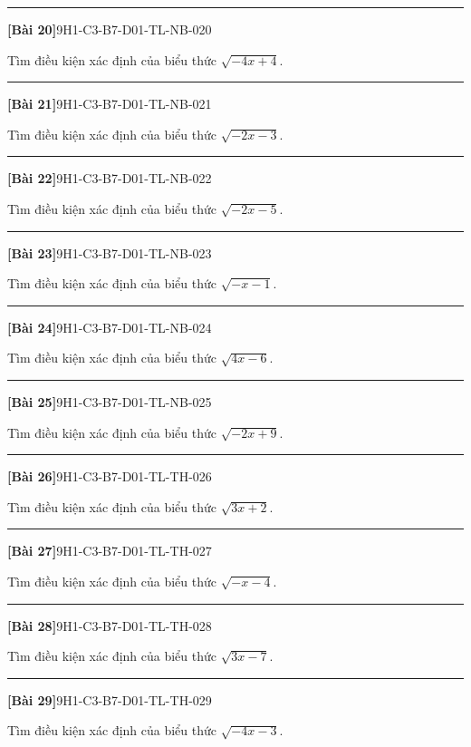 \documentclass[12pt,a4paper]{article}
\newif\ifloigiai
\newenvironment{cauhoi}[2]{%
  \par\medskip\noindent\rule{\textwidth}{0.4pt}\par\nopagebreak
  \noindent\textbf{[#1]}\hfill{\scriptsize\ttfamily #2}\par\nopagebreak\smallskip}{\par}
\newcommand{\loigiai}[1]{\ifloigiai\par\smallskip\noindent\textit{Lời giải.} #1\par\fi}
\begin{document}
\begin{cauhoi}{Bài 20}{9H1-C3-B7-D01-TL-NB-020}
Tìm điều kiện xác định của biểu thức $\sqrt{-4x + 4}$.
\loigiai{Biểu thức xác định khi $-4x + 4\ge 0$, tức là $4x\le 4$, suy ra $x\le 1$.}
\end{cauhoi}
\begin{cauhoi}{Bài 21}{9H1-C3-B7-D01-TL-NB-021}
Tìm điều kiện xác định của biểu thức $\sqrt{-2x - 3}$.
\loigiai{Biểu thức xác định khi $-2x - 3\ge 0$, tức là $2x\le -3$, suy ra $x\le -\dfrac{3}{2}$.}
\end{cauhoi}
\begin{cauhoi}{Bài 22}{9H1-C3-B7-D01-TL-NB-022}
Tìm điều kiện xác định của biểu thức $\sqrt{-2x - 5}$.
\loigiai{Biểu thức xác định khi $-2x - 5\ge 0$, tức là $2x\le -5$, suy ra $x\le -\dfrac{5}{2}$.}
\end{cauhoi}
\begin{cauhoi}{Bài 23}{9H1-C3-B7-D01-TL-NB-023}
Tìm điều kiện xác định của biểu thức $\sqrt{-x - 1}$.
\loigiai{Biểu thức xác định khi $-x - 1\ge 0$, tức là $x\le -1$, suy ra $x\le -1$.}
\end{cauhoi}
\begin{cauhoi}{Bài 24}{9H1-C3-B7-D01-TL-NB-024}
Tìm điều kiện xác định của biểu thức $\sqrt{4x - 6}$.
\loigiai{Biểu thức xác định khi $4x - 6\ge 0$, tức là $x\ge \dfrac{3}{2}$.}
\end{cauhoi}
\begin{cauhoi}{Bài 25}{9H1-C3-B7-D01-TL-NB-025}
Tìm điều kiện xác định của biểu thức $\sqrt{-2x + 9}$.
\loigiai{Biểu thức xác định khi $-2x + 9\ge 0$, tức là $2x\le 9$, suy ra $x\le \dfrac{9}{2}$.}
\end{cauhoi}
\begin{cauhoi}{Bài 26}{9H1-C3-B7-D01-TL-TH-026}
Tìm điều kiện xác định của biểu thức $\sqrt{3x + 2}$.
\loigiai{Biểu thức xác định khi $3x + 2\ge 0$, tức là $x\ge -\dfrac{2}{3}$.}
\end{cauhoi}
\begin{cauhoi}{Bài 27}{9H1-C3-B7-D01-TL-TH-027}
Tìm điều kiện xác định của biểu thức $\sqrt{-x - 4}$.
\loigiai{Biểu thức xác định khi $-x - 4\ge 0$, tức là $x\le -4$, suy ra $x\le -4$.}
\end{cauhoi}
\begin{cauhoi}{Bài 28}{9H1-C3-B7-D01-TL-TH-028}
Tìm điều kiện xác định của biểu thức $\sqrt{3x - 7}$.
\loigiai{Biểu thức xác định khi $3x - 7\ge 0$, tức là $x\ge \dfrac{7}{3}$.}
\end{cauhoi}
\begin{cauhoi}{Bài 29}{9H1-C3-B7-D01-TL-TH-029}
Tìm điều kiện xác định của biểu thức $\sqrt{-4x - 3}$.
\loigiai{Biểu thức xác định khi $-4x - 3\ge 0$, tức là $4x\le -3$, suy ra $x\le -\dfrac{3}{4}$.}
\end{cauhoi}
\end{document}
